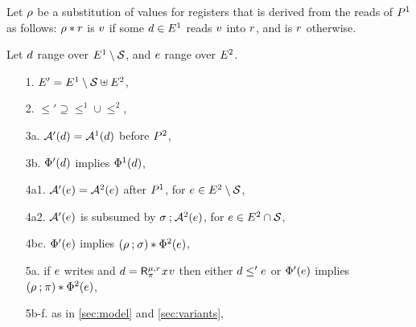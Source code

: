 \begin{definition}
Let $\SUBDRS{\aPS}$ be a substitution of values for registers that is derived
from the reads of $\aPS^1$ as follows: $\SUBDRS{\aPS}\SUBAPP\aReg$ is $\aVal$
if some $\bEv\in\Event^1$ reads $\aVal$ into $\aReg$, and is $\aReg$ otherwise.

Let $\bEv$ range over $\Event^1\setminus\Sub$, and $\aEv$ range over $\Event^2$.  


\begin{enumerate}
\item[1.] $\Event' = \Event^1\setminus\Sub \uplus \Event^2$,
\item[2.] ${\le'}\supseteq{\le^1}\cup{\le^2}$, 
\item[3a.] $\labelingAct'(\bEv) = \labelingAct^1(\bEv)$ before $\aPS^2$,
\item[3b.] $\labelingForm'(\bEv)$ implies $\labelingForm^1(\bEv)$,
\item[4a1.] $\labelingAct'(\aEv) = \labelingAct^2(\aEv)$  after $\aPS^1$,  for $\aEv\in\Event^2\setminus\Sub$,
\item[4a2.] $\labelingAct'(\aEv)$ is subsumed by $\aSubC\SUBSEQ\labelingAct^2(\aEv)$,  for $\aEv\in\Event^2\cap\Sub$, 
\item[4bc.] $\labelingForm'(\aEv)$ implies
  $(\SUBDRS{\aPS^1} \SUBSEQ \aSubC)\SUBAPP\labelingForm^2(\aEv)$, 
\item[5a.] if $\aEv$ writes and
  $\bEv=\DRreg[\amode]{\aReg}{\bSub}{\aLoc}{\aVal}$
  then either $\bEv\le'\aEv$ or
  $\labelingForm'(\aEv)$ implies  
  $(\SUBDRS{\aPS^1}\SUBSEQ \bSub)\SUBAPP\labelingForm^2(\aEv)$,
\item[5b-f.] as in \textsection\ref{sec:model} and \textsection\ref{sec:variants},

\end{enumerate}
\end{definition}
